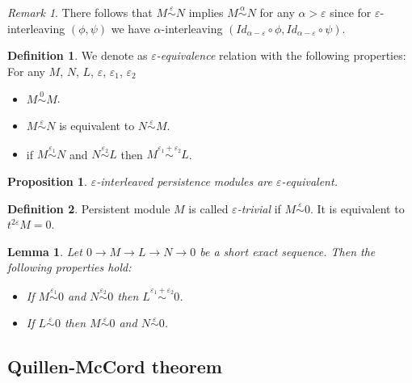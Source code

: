 \documentclass[a4paper, 12pt]{article}
\newtheorem{proposition}{Proposition}
\newtheorem{lemma}{Lemma}
\theoremstyle{definition}
\newtheorem{definition}{Definition}
\theoremstyle{remark}
\newtheorem{remark}{Remark}
\newcommand{\define}[1]{{\textit{#1}}}
\begin{document}
\begin{remark}
There follows that $M \stackrel{\varepsilon}{\sim} N$ implies $M \stackrel{\alpha}{\sim} N$ for any $\alpha > \varepsilon$ since for $\varepsilon$-interleaving $(\phi, \psi)$ we have $\alpha$-interleaving $(Id_{\alpha - \varepsilon} \circ \phi, Id_{\alpha - \varepsilon} \circ \psi)$.
\end{remark}

\begin{definition}
  We denote as \define{$\varepsilon$-equivalence} relation with the following properties:\\
  For any $M$, $N$, $L$, $\varepsilon$, $\varepsilon_1$, $\varepsilon_2$
  \begin{itemize}
    \item $M \stackrel{0}{\sim} M$.
    \item $M \stackrel{\varepsilon}{\sim} N$ is equivalent to $N \stackrel{\varepsilon}{\sim} M$.
    \item if $M \stackrel{\varepsilon_1}{\sim} N$ and $N \stackrel{\varepsilon_2}{\sim} L$ then $M \stackrel{\varepsilon_1 + \varepsilon_2}{\sim} L$.
  \end{itemize}
\end{definition}

\begin{proposition}
  $\varepsilon$-interleaved persistence modules are $\varepsilon$-equivalent.
\end{proposition}

\begin{definition}
  Persistent module $M$ is called \define{$\varepsilon$-trivial} if $M \stackrel{\varepsilon}{\sim} 0$. It is equivalent to $t^{2\varepsilon}M = 0$.
\end{definition}

\begin{lemma}
  Let $0 \to M \to L \to N \to 0$ be a short exact sequence. Then the following properties hold:
  \begin{itemize}
    \item If $M \stackrel{\varepsilon_1}{\sim} 0$ and $N \stackrel{\varepsilon_2}{\sim} 0$ then $L \stackrel{\varepsilon_1 + \varepsilon_2}{\sim} 0$.
    \item If $L \stackrel{\varepsilon}{\sim} 0$ then $M \stackrel{\varepsilon}{\sim} 0$ and $N \stackrel{\varepsilon}{\sim} 0$.
  \end{itemize}
\end{lemma}

\subsection{Quillen-McCord theorem}
\end{document}
